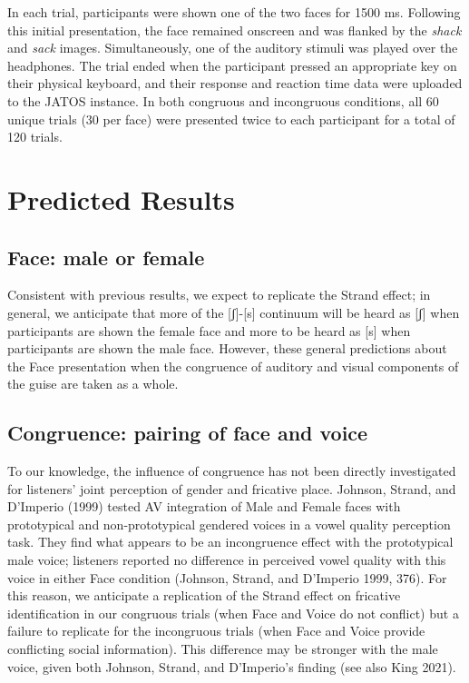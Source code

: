 \documentclass[
  letterpaper,
  DIV=11,
  numbers=noendperiod]{scrartcl}
\begin{document}
In each trial, participants were shown one of the two faces for 1500 ms.
Following this initial presentation, the face remained onscreen and was
flanked by the \emph{shack} and \emph{sack} images. Simultaneously, one
of the auditory stimuli was played over the headphones. The trial ended
when the participant pressed an appropriate key on their physical
keyboard, and their response and reaction time data were uploaded to the
JATOS instance. In both congruous and incongruous conditions, all 60
unique trials (30 per face) were presented twice to each participant for
a total of 120 trials.

\section{Predicted Results}\label{sec-predictions}

\subsection{Face: male or female}\label{sec-pred-face}

Consistent with previous results, we expect to replicate the Strand
effect; in general, we anticipate that more of the {[}ʃ{]}-{[}s{]}
continuum will be heard as {[}ʃ{]} when participants are shown the
female face and more to be heard as {[}s{]} when participants are shown
the male face. However, these general predictions about the Face
presentation when the congruence of auditory and visual components of
the guise are taken as a whole.

\subsection{Congruence: pairing of face and
voice}\label{sec-pred-congruence}

To our knowledge, the influence of congruence has not been directly
investigated for listeners' joint perception of gender and fricative
place. Johnson, Strand, and D'Imperio (1999) tested AV integration of
Male and Female faces with prototypical and non-prototypical gendered
voices in a vowel quality perception task. They find what appears to be
an incongruence effect with the prototypical male voice; listeners
reported no difference in perceived vowel quality with this voice in
either Face condition (Johnson, Strand, and D'Imperio 1999, 376). For
this reason, we anticipate a replication of the Strand effect on
fricative identification in our congruous trials (when Face and Voice do
not conflict) but a failure to replicate for the incongruous trials
(when Face and Voice provide conflicting social information). This
difference may be stronger with the male voice, given both Johnson,
Strand, and D'Imperio's finding (see also King 2021).
\end{document}
